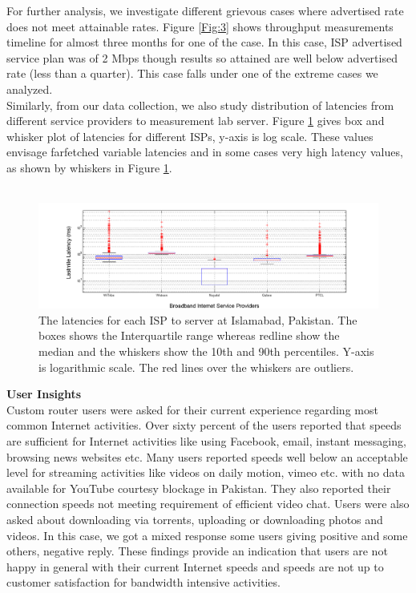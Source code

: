 \documentclass{sig-alternate-10pt}
\begin{document}
\indent For further analysis, we investigate different grievous cases where advertised rate does not meet attainable rates. Figure \ref{Fig:3} shows throughput measurements timeline for almost three months for one of the case. In this case, ISP advertised service plan was of 2 Mbps though results so attained are well below advertised rate (less than a quarter).  This case falls under one of the extreme cases we analyzed.\\


\indent Similarly, from our data collection, we also study distribution of latencies from different service providers to measurement lab server. Figure \ref{Fig:4} gives box and whisker plot of latencies for different ISPs, y-axis is log scale. These values envisage farfetched variable latencies and in some cases very high latency values, as shown by whiskers in Figure \ref{Fig:4}.\\\\

\begin{figure}[h!]
\begin {center}
   \includegraphics[height=0.2 \textheight,width=0.5 \textwidth]{4.png}
   \end {center}
 \caption{The latencies for each ISP to server at Islamabad, Pakistan. The boxes shows the Interquartile range whereas redline show the median and the whiskers show the 10th and 90th percentiles. Y-axis is logarithmic scale. The red lines over the whiskers are outliers.}
 \label{Fig:4}
\end{figure}



\textbf{User Insights}\\
\indent Custom router users were asked for their current experience regarding most common Internet activities. Over sixty percent of the users reported that speeds are sufficient for Internet activities like using Facebook, email, instant messaging, browsing news websites etc. Many users reported speeds well below an acceptable level for streaming activities like videos on daily motion, vimeo etc. with no data available for YouTube courtesy blockage in Pakistan. They also reported their connection speeds not meeting requirement of efficient video chat. Users were also asked about downloading via torrents, uploading or downloading photos and videos. In this case, we got a mixed response some users giving positive and some others, negative reply. These findings provide an indication that users are not happy in general with their current Internet speeds and speeds are not up to customer satisfaction for bandwidth intensive activities.
\end{document}
